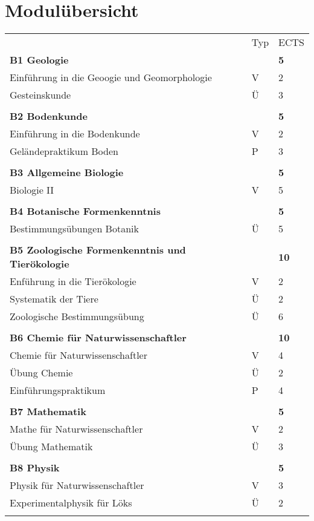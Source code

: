 \section{Modulübersicht}
\begin{longtable}{p{} p{} p{}}
 & Typ & ECTS \\ 
\textbf{B1 Geologie} & & \textbf{5}\\ 
Einführung in die Geoogie und Geomorphologie & V & 2\\
Gesteinskunde & Ü & 3\\
& &\\
\textbf{B2 Bodenkunde}& & \textbf{5}\\
Einführung in die Bodenkunde & V & 2\\
Geländepraktikum Boden & P & 3\\
& &\\
\textbf{B3 Allgemeine Biologie}& & \textbf{5}\\
Biologie II & V &5\\
& &\\
\textbf{B4 Botanische Formenkenntnis} & & \textbf{5}\\
Bestimmungsübungen Botanik & Ü & 5\\
& &\\
\textbf{B5 Zoologische Formenkenntnis und Tierökologie} & &\textbf{10}\\
Enführung in die Tierökologie & V & 2\\
Systematik der Tiere & Ü & 2\\
Zoologische Bestimmungsübung & Ü & 6\\
& &\\
\textbf{B6 Chemie für Naturwissenschaftler} & & \textbf{10}\\
Chemie für Naturwissenschaftler & V & 4\\
Übung Chemie & Ü & 2\\
Einführungspraktikum & P & 4 \\
&&\\
\textbf{B7 Mathematik} & &\textbf{5}\\
Mathe für Naturwissenschaftler & V & 2\\
Übung Mathematik & Ü & 3\\
&&\\
\textbf{B8 Physik} & & \textbf{5}\\
Physik für Naturwissenschaftler & V & 3 \\
Experimentalphysik für Löks & Ü & 2\\
&&\\

\end{longtable}
